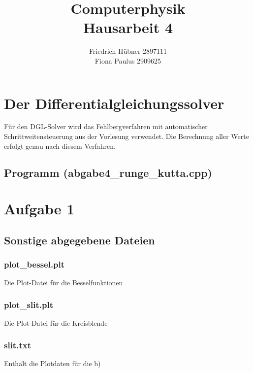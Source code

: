 \documentclass{scrreprt}
\author{Friedrich Hübner 2897111\\
Fiona Paulus 2909625}
\title{Computerphysik\\Hausarbeit 4}
\begin{document}
\maketitle
\newpage

\chapter*{Der Differentialgleichungssolver}
Für den DGL-Solver wird das Fehlbergverfahren mit automatischer Schrittweitensteuerung aus der Vorlesung verwendet. Die Berechnung aller Werte erfolgt genau nach diesem Verfahren.

\section*{Programm (abgabe4_runge_kutta.cpp)}


\chapter*{Aufgabe 1}


\section*{Sonstige abgegebene Dateien}
\subsection*{plot\_bessel.plt}
Die Plot-Datei für die Besselfunktionen
\subsection*{plot\_slit.plt}
Die Plot-Datei für die Kreisblende
\subsection*{slit.txt}
Enthält die Plotdaten für die b)
\end{document}
